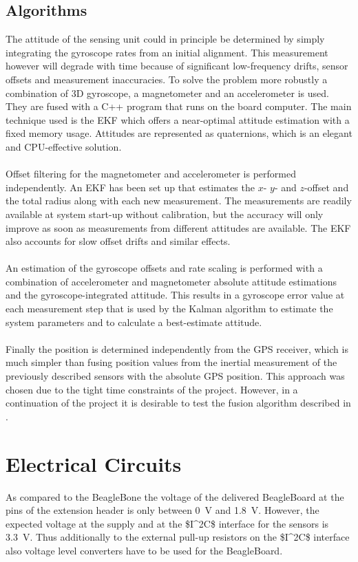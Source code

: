 
\subsection{Algorithms}

The attitude of the sensing unit could in principle be determined by simply integrating the gyroscope rates from an initial alignment. This measurement however will degrade with time because of significant low-frequency drifts, sensor offsets and measurement inaccuracies. To solve the problem more robustly a combination of 3D gyroscope, a magnetometer and an accelerometer is used. They are fused with a C++ program that runs on the board computer. The main technique used is the \ac{EKF} which offers a near-optimal attitude estimation with a fixed memory usage. Attitudes are represented as quaternions, which is an elegant and \ac{CPU}-effective solution.
\\
\\
Offset filtering for the magnetometer and accelerometer is performed independently. An \ac{EKF} has been set up that estimates the $x$- $y$- and $z$-offset and the total radius along with each new measurement. The measurements are readily available at system start-up without calibration, but the accuracy will only improve as soon as measurements from different attitudes are available. The \ac{EKF} also accounts for slow offset drifts and similar effects.
\\
\\
An estimation of the gyroscope offsets and rate scaling is performed with a combination of accelerometer and magnetometer absolute attitude estimations and the gyroscope-integrated attitude. This results in a gyroscope error value at each measurement step that is used by the Kalman algorithm to estimate the system parameters and to calculate a best-estimate attitude.
\\
\\
Finally the position is determined independently from the \ac{GPS} receiver, which is much simpler than fusing position values from the inertial measurement of the previously described sensors with the absolute \ac{GPS} position. This approach was chosen due to the tight time constraints of the project. However, in a continuation of the project it is desirable to test the fusion algorithm described in \cite[chap. 6.4]{book:stochastic}.

\FloatBarrier
\section{Electrical Circuits}

As compared to the BeagleBone the voltage of the delivered BeagleBoard at the pins of the extension header is only between 0~V and 1.8~V. However, the expected voltage at the supply and at the \ac{$I^2C$} interface for the sensors is 3.3~V. Thus additionally to the external pull-up resistors on the \ac{$I^2C$} interface also voltage level converters have to be used for the BeagleBoard.